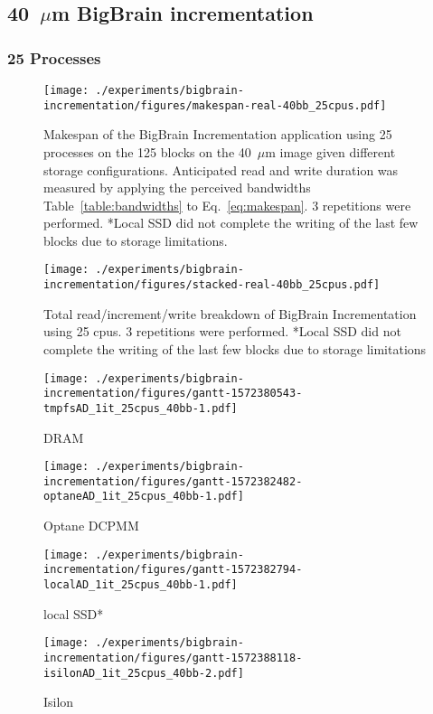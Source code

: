 \documentclass[conference]{IEEEtran}
\newcommand{\bigbrain}{BigBrain\xspace}
\begin{document}
\subsection{40~$\mu$m \bigbrain incrementation}
\subsubsection{25 Processes}
\begin{figure}
    \texttt{[image: ./experiments/bigbrain-incrementation/figures/makespan-real-40bb\_25cpus.pdf]}
    \captionsetup{belowskip=-10pt}
    \caption{Makespan of the \bigbrain Incrementation application using 25 
             processes on the 125 blocks on the 40~$\mu$m image given different
             storage configurations. Anticipated read and write duration was 
             measured by applying the perceived bandwidths Table~\ref{table:bandwidths}
             to Eq.~\ref{eq:makespan}. 3 
             repetitions were performed. *Local SSD did not complete the
    writing of the last few blocks due to storage limitations.}\label{fig:makespan-25cpus}
\end{figure}
\begin{figure}
    \texttt{[image: ./experiments/bigbrain-incrementation/figures/stacked-real-40bb\_25cpus.pdf]}
    \captionsetup{belowskip=0pt}
    \caption{Total read/increment/write breakdown of \bigbrain Incrementation using 25 cpus. 3 repetitions were performed. *Local SSD did not
             complete the writing of the last few blocks due to storage limitations}\label{fig:stacked-25cpus}
\end{figure}
\begin{figure*}
    \begin{subfigure}{\columnwidth}
        \centering
    \texttt{[image: ./experiments/bigbrain-incrementation/figures/gantt-1572380543-tmpfsAD\_1it\_25cpus\_40bb-1.pdf]}
    \caption{DRAM}
\end{subfigure}
\begin{subfigure}{\columnwidth}
        \centering
    \texttt{[image: ./experiments/bigbrain-incrementation/figures/gantt-1572382482-optaneAD\_1it\_25cpus\_40bb-1.pdf]}
    \caption{Optane DCPMM}
\end{subfigure}
\begin{subfigure}{\columnwidth}
        \centering
    \texttt{[image: ./experiments/bigbrain-incrementation/figures/gantt-1572382794-localAD\_1it\_25cpus\_40bb-1.pdf]}
    \caption{local SSD*}
\end{subfigure}
\begin{subfigure}{\columnwidth}
        \centering
    \texttt{[image: ./experiments/bigbrain-incrementation/figures/gantt-1572388118-isilonAD\_1it\_25cpus\_40bb-2.pdf]}
    \caption{Isilon}\label{fig:gantt25isilon}
\end{subfigure}
    \captionsetup{belowskip=-10pt}
\caption{Gantt charts for each storage device (App Direct Mode) processing 125 blocks of the 40$\mu$m BigBrain using 25 processes. *Some local SSD writes did not complete due to storage limitations.}\label{fig:gantt25}
\end{figure*}
\end{document}
